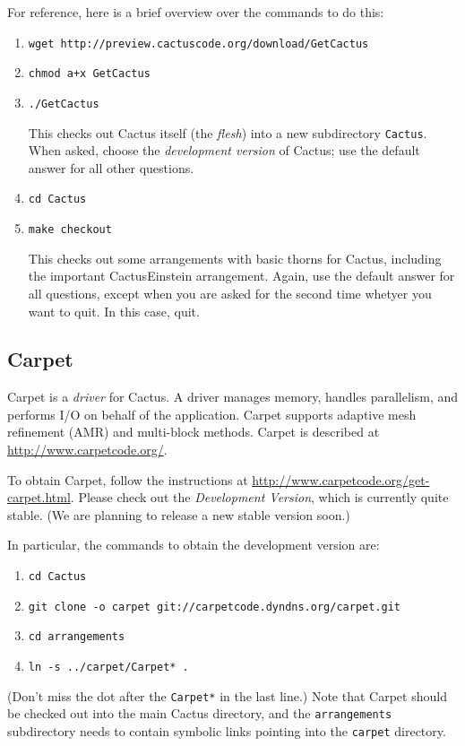 \documentclass[11pt, tightenlines]{revtex4}
\newcommand{\code}[1]{\texttt{#1}}
\begin{document}
For reference, here is a brief overview over the commands to do this:
\begin{enumerate}
\item\verb+wget http://preview.cactuscode.org/download/GetCactus+
\item\verb-chmod a+x GetCactus-
\item\verb+./GetCactus+
  
  This checks out Cactus itself (the \emph{flesh}) into a new
  subdirectory \code{Cactus}.  When asked, choose the
  \emph{development version} of Cactus; use the default answer for all
  other questions.
\item\verb+cd Cactus+
\item\verb+make checkout+
  
  This checks out some arrangements with basic thorns for Cactus,
  including the important CactusEinstein arrangement.  Again, use the
  default answer for all questions, except when you are asked for the
  second time whetyer you want to quit.  In this case, quit.
\end{enumerate}

\subsection{Carpet}

Carpet \cite{ES-Schnetter2003b, ES-Schnetter2006a, ES-carpetweb} is a
\emph{driver} for Cactus.  A driver manages memory, handles
parallelism, and performs I/O on behalf of the application.  Carpet
supports adaptive mesh refinement (AMR) and multi-block methods.
Carpet is described at \url{http://www.carpetcode.org/}.

To obtain Carpet, follow the instructions at
\url{http://www.carpetcode.org/get-carpet.html}.  Please check out the
\emph{Development Version}, which is currently quite stable.  (We are
planning to release a new stable version soon.)

In particular, the commands to obtain the development version are:
\begin{enumerate}
\item\verb+cd Cactus+
\item\verb+git clone -o carpet git://carpetcode.dyndns.org/carpet.git+
\item\verb+cd arrangements+
\item\verb+ln -s ../carpet/Carpet* .+
\end{enumerate}
(Don't miss the dot after the \verb+Carpet*+ in the last line.)  Note
that Carpet should be checked out into the main Cactus directory, and
the \code{arrangements} subdirectory needs to contain symbolic links
pointing into the \code{carpet} directory.
\end{document}
